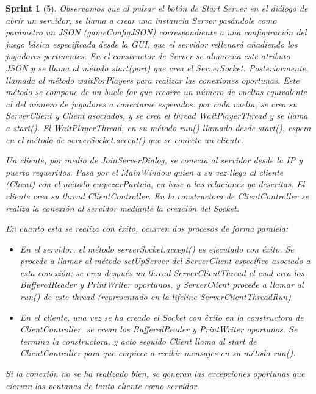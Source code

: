 \documentclass{article}
\theoremstyle{break}
\newtheorem*{sprint}{Sprint}
\begin{document}
\begin{sprint}[5]
Observamos que al pulsar el botón de Start Server en el diálogo de abrir un servidor, se llama a crear una instancia Server pasándole como parámetro un JSON (gameConfigJSON) correspondiente a una configuración del juego básica especificada desde la GUI, que el servidor rellenará añadiendo los jugadores pertinentes.
En el constructor de Server se almacena este atributo JSON y se llama al método start(port) que crea el ServerSocket. Posteriormente, llamada al método waitForPlayers para realizar las conexiones oportunas.
Este método se compone de un bucle for que recorre un número de vueltas equivalente al del número de jugadores a conectarse esperados. por cada vuelta, se crea su ServerClient y Client asociados, y se crea el thread WaitPlayerThread y se llama a start(). El WaitPlayerThread, en su método run() llamado desde start(), espera en el método de serverSocket.accept() que se conecte un cliente.

Un cliente, por medio de JoinServerDialog, se conecta al servidor desde la IP y puerto requeridos. Pasa por el MainWindow quien a su vez llega al cliente (Client) con el método empezarPartida, en base a las relaciones ya descritas. El cliente crea su thread ClientController. En la constructora de ClientController se realiza la conexión al servidor mediante la creación del Socket.

En cuanto esta se realiza con éxito, ocurren dos procesos de forma paralela:

\begin{itemize}
\item En el servidor, el método serverSocket.accept() es ejecutado con éxito. Se procede a llamar al método setUpServer del ServerClient específico asociado a esta conexión; se crea después un thread ServerClientThread el cual crea los BufferedReader y PrintWriter oportunos, y ServerClient procede a llamar al run() de este thread (representado en la lifeline ServerClientThreadRun)

\item En el cliente, una vez se ha creado el Socket con éxito en la constructora de ClientController, se crean los BufferedReader y PrintWriter oportunos. Se termina la constructora, y acto seguido Client llama al start de ClientController para que empiece a recibir mensajes en su método run().
\end{itemize}

Si la conexión no se ha realizado bien, se generan las excepciones oportunas que cierran las ventanas de tanto cliente como servidor.


\end{sprint}
\end{document}
